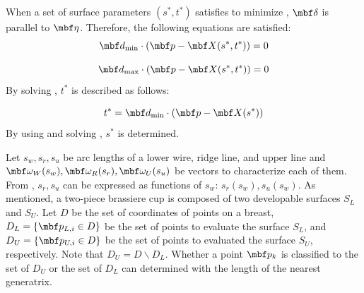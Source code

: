 \documentclass[E]{scitrans}
\begin{document}
When a set of surface parameters $ (s^*,t^*) $ satisfies to minimize , $\mbold{\delta}$ is parallel to $ \etavec $. Therefore, the following equations are satisfied:
\begin{equation}\label{eq:d_mindoteq}
\mbold{d}_{\min} \cdot (\mbold{p} - \mbold{X}(s^*,t^*)) = 0
\end{equation}

\begin{equation}\label{eq:d_maxdoteq}
\mbold{d}_{\max} \cdot (\mbold{p} - \mbold{X}(s^*,t^*)) = 0
\end{equation}
By solving , $ t^* $ is described as follows:

\begin{equation}\label{eq:t*_eq}
t^* = \mbold{d}_{\min} \cdot (\mbold{p}-\mbold{X}(s^*))
\end{equation}
By using  and solving , $ s^* $ is determined.

Let $ s_w,s_r,s_u $ be arc lengths of a lower wire, ridge line, and upper line and $ \mbold{\omega}_W (s_w ),\mbold{\omega}_R (s_r ),\mbold{\omega}_U (s_u ) $ be vectors to characterize each of them. From , $ s_r,s_u $ can be expressed as functions of $ s_w $: $ s_r (s_w ),s_u (s_w ) $. As mentioned, a two-piece brassiere cup is composed of two developable surfaces $ S_L $ and $ S_U $. Let $ D $ be the set of coordinates of points on a breast, $ D_L = \{\mbold{p}_{L,i} \in D \} $ be the set of points to evaluate the surface $ S_L $, and $ D_U = \{\mbold{p}_{U,i} \in D \} $ be the set of points to evaluated the surface $ S_U $, respectively. Note that $ D_U = D \backslash D_L $. Whether a point $ \mbold{p}_k $ is classified to the set of $ D_U $ or the set of $ D_L $ can determined with the length of the nearest generatrix.
\end{document}
